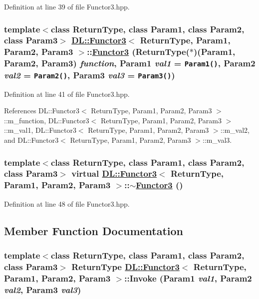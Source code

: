 Definition at line 39 of file Functor3.hpp.\hypertarget{classDL_1_1Functor3_a0}{
\subsubsection[Functor3]{\setlength{\rightskip}{0pt plus 5cm}template$<$class Return\-Type, class Param1, class Param2, class Param3$>$ \hyperlink{classDL_1_1Functor3}{DL::Functor3}$<$ Return\-Type, Param1, Param2, Param3 $>$::\hyperlink{classDL_1_1Functor3}{Functor3} (Return\-Type($\ast$)(Param1, Param2, Param3) {\em function}, Param1 {\em val1} = {\tt Param1()}, Param2 {\em val2} = {\tt Param2()}, Param3 {\em val3} = {\tt Param3()})}}
\label{classDL_1_1Functor3_a0}




Definition at line 41 of file Functor3.hpp.

References DL::Functor3$<$ Return\-Type, Param1, Param2, Param3 $>$::m\_\-function, DL::Functor3$<$ Return\-Type, Param1, Param2, Param3 $>$::m\_\-val1, DL::Functor3$<$ Return\-Type, Param1, Param2, Param3 $>$::m\_\-val2, and DL::Functor3$<$ Return\-Type, Param1, Param2, Param3 $>$::m\_\-val3.\hypertarget{classDL_1_1Functor3_a1}{
\subsubsection[$\sim$Functor3]{\setlength{\rightskip}{0pt plus 5cm}template$<$class Return\-Type, class Param1, class Param2, class Param3$>$ virtual \hyperlink{classDL_1_1Functor3}{DL::Functor3}$<$ Return\-Type, Param1, Param2, Param3 $>$::$\sim$\hyperlink{classDL_1_1Functor3}{Functor3} ()}}
\label{classDL_1_1Functor3_a1}




Definition at line 48 of file Functor3.hpp.

\subsection{Member Function Documentation}
\hypertarget{classDL_1_1Functor3_a3}{
\subsubsection[Invoke]{\setlength{\rightskip}{0pt plus 5cm}template$<$class Return\-Type, class Param1, class Param2, class Param3$>$ Return\-Type \hyperlink{classDL_1_1Functor3}{DL::Functor3}$<$ Return\-Type, Param1, Param2, Param3 $>$::Invoke (Param1 {\em val1}, Param2 {\em val2}, Param3 {\em val3})}}
\label{classDL_1_1Functor3_a3}




